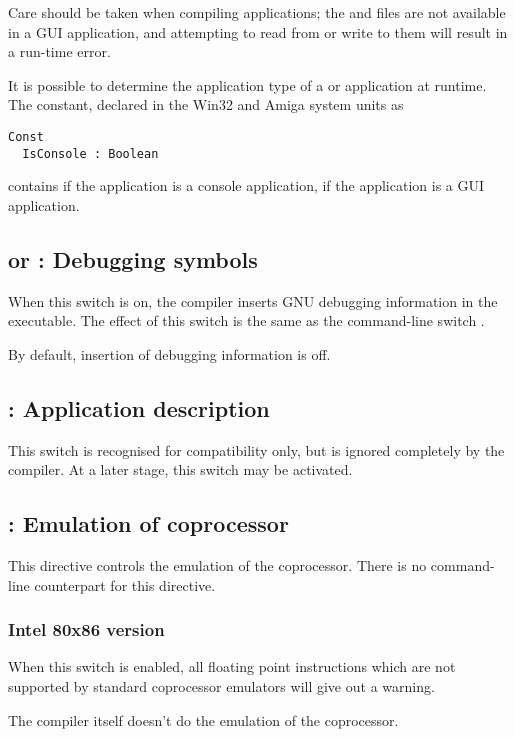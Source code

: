 Care should be taken when compiling  applications; the 
and  files are not available in a GUI application, and
attempting to read from or write to them will result in a run-time error.

It is possible to determine the application type of a \windows or \amiga application
at runtime. The  constant, declared in the Win32 and Amiga
system units as
\begin{verbatim}
Const
  IsConsole : Boolean
\end{verbatim}
contains  if the application is a console application, 
if the application is a GUI application.

\subsection{ or  : Debugging symbols}

When this switch is on,
the compiler inserts GNU debugging information in
the executable. The effect of this switch is the same as the command-line
switch .

By default, insertion of debugging information is off.

\subsection{ : Application description}

This switch is recognised for compatibility only, but is ignored completely
by the compiler. At a later stage, this switch may be activated.

\subsection{ : Emulation of coprocessor}

This directive controls the emulation of the coprocessor. There is no
command-line counterpart for this directive.

\subsubsection{Intel 80x86 version}

When this switch is enabled, all floating point instructions
which are not supported by standard coprocessor emulators will give out
a warning.

The compiler itself doesn't do the emulation of the coprocessor.

